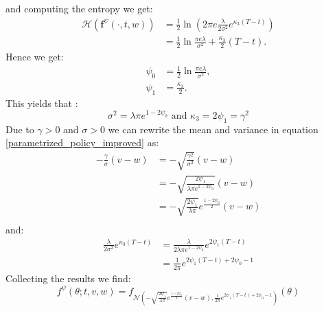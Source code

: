 \documentclass[oneside, a4paper, onecolumn, 11pt]{article}
\begin{document}
and computing the entropy we get: 
\begin{align*}
    \mathcal{H}(\boldsymbol{f}^\psi(\cdot, t,w)) &= \frac{1}{2}\ln\left(2\pi e \frac{\lambda}{2\sigma^2}e^{\kappa_3(T-t)}\right) \\ 
    &= \frac{1}{2}\ln\frac{\pi e\lambda}{\sigma^2} + \frac{\kappa_3}{2}(T-t).
\end{align*}
Hence we get:  
\begin{align*}
    \psi_0 &= \frac{1}{2}\ln{\frac{\pi e \lambda}{\sigma^2}},\\
    \psi_1 &= \frac{\kappa_3}{2}.
\end{align*}
This yields that : 
\begin{equation}
    \sigma^2 = \lambda \pi e^{1-2\psi_0} \text{ and } \kappa_3 = 2\psi_1 = \gamma^2 
\end{equation}
Due to $\gamma>0$ and $\sigma>0$ we can rewrite the mean and variance in equation \eqref{parametrized_policy_improved} as: 
\begin{align*}
    -\frac{\gamma}{\sigma}(v-w) &= -\sqrt{\frac{\gamma^2}{\sigma^2}}(v-w) \\ 
    &= -\sqrt{\frac{2\psi_1}{\lambda\pi e^{1-2\psi_0}}}(v-w)\\ 
    &= -\sqrt{\frac{2\psi_1}{\lambda \pi}}e^{\frac{1-2\psi_0}{2}}(v-w) \\ 
\end{align*}
and: 
\begin{align*}
    \frac{\lambda}{2\sigma^2}e^{\kappa_3(T-t)} &= \frac{\lambda}{2\lambda \pi e^{1-2\psi_0}}e^{2\psi_1(T-t)} \\
    &= \frac{1}{2\pi} e^{2\psi_1(T-t) + 2\psi_0 -1}
\end{align*}
Collecting the results we find: 
\begin{equation}
    f^{\psi}(\theta; t, v,w) = f_{\mathcal{N}\left(-\sqrt{\frac{2\psi_1}{\lambda \pi}}e^{\frac{1-2\psi_0}{2}}(v-w) , \frac{1}{2\pi} e^{2\psi_1(T-t) + 2\psi_0 -1} \right)}(\theta) \label{eq:parametrized-gaussian}
    \end{equation}
\end{document}
